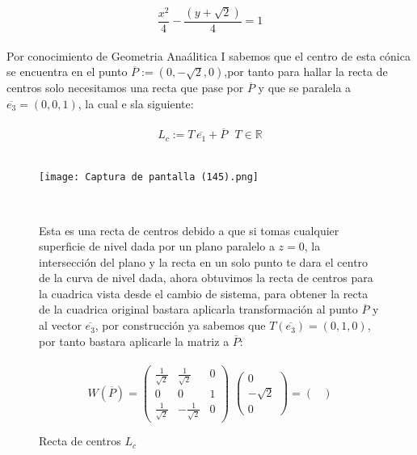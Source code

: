 \documentclass[11pt,letterpaper]{article}
\newcommand{\R}{\mathbb{R}}
\begin{document}
     \begin{equation*}
        \frac{x^2}{4}-\frac{(y+\sqrt{2})}{4}=1
     \end{equation*}\,\\
     Por conocimiento de Geometria Ana\'alitica I sabemos que el centro de esta c\'onica se encuentra en el punto $\overline{P}:=(0,-\sqrt{2},0)$,por tanto
     para hallar la recta de centros solo necesitamos una recta que pase por $\overline{P}$ y que se paralela a $\overline{e_3}=(0,0,1)$, la cual e sla siguiente:\,\\
     \,\\
     \begin{equation*}
        L_c:=T\,\overline{e_1}+\overline{P}\,\,\,\,T\in \R
     \end{equation*}\,\\
     \begin{figure}
    \begin{center}
    \texttt{[image: Captura de pantalla (145).png]}
    \caption{Recta de centros $L_{c}$}
    \label{Cono rebanado}\,\\
    \end{center}
    Esta es una recta de centros debido a que si tomas cualquier superficie de nivel dada por un plano paralelo a $z=0$, la intersecci\'on del plano y la recta en un solo punto
    te dara el centro de la curva de nivel dada, ahora obtuvimos la recta de centros para la cuadrica vista desde el cambio de sistema, para obtener la recta de la cuadrica original bastara
    aplicarla transformaci\'on al punto $\overline{P}$ y al vector $\overline{e_3}$, por construcci\'on ya sabemos que $T(\overline{e_3})=(0,1,0)$, por tanto bastara
    aplicarle la matriz a $\overline{P}$:\,\\
     \,\\
    \begin{equation*}
        W(\overline{P})= \begin{pmatrix}
                \frac{1}{\sqrt{2}} & \frac{1}{\sqrt{2}} & 0\\
                0 & 0& 1\\
                 \frac{1}{\sqrt{2}} & -\frac{1}{\sqrt{2}} &0
                \end{pmatrix}\,\,\begin{pmatrix}
                0\\
                -\sqrt{2}\\
                0
                \end{pmatrix}=\begin{pmatrix}

\end{pmatrix}
\end{equation*}
\end{figure}
\end{document}
